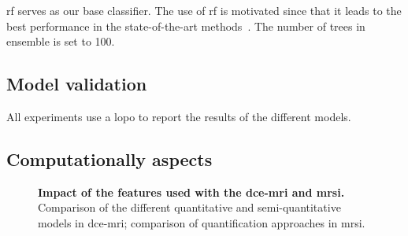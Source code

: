 \documentclass[final,3p,times,twocolumn]{elsarticle}
\begin{document}
\ac{rf} serves as our base classifier. The use of \ac{rf} is motivated since
that it leads to the best performance in the state-of-the-art
methods~\cite{Litjens2014,lemaitre2015computer}. The number of trees in
ensemble is set to 100.

\subsection{Model validation}

All experiments use a \ac{lopo} to report the results of the different models.

\subsection{Computationally aspects}

\begin{figure}
  \hspace*{\fill}
  \hfill
  \hspace*{\fill}
  \caption[]{\textbf{Impact of the features used with the \ac{dce}-\ac{mri} and
    \ac{mrsi}.} \protect{} Comparison of the different
  quantitative and semi-quantitative models in \ac{dce}-\ac{mri};
  \protect{} comparison of quantification approaches in
  \ac{mrsi}.}
  \label{fig:dce_results}
\end{figure}
\end{document}

